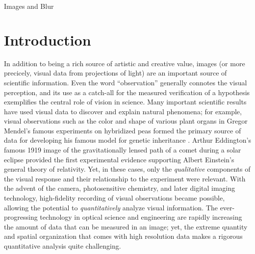 \setlength{\parindent}{2ex}
\begin{chapter}{Images and Blur}\label{chapter:introduction}
  \section{Introduction}
  In addition to being a rich source of artistic and creative value, images (or more precicely, visual data from projections of light) are an important source of scientific information.
  Even the word ``observation'' generally connotes the visual perception, and its use as a catch-all for the measured verification of a hypothesis exemplifies the central role of vision in science.
  Many important scientific results have used visual data to discover and explain natural phenomena; for example, visual observations such as the color and shape of various plant organs in Gregor Mendel's famous experiments on hybridized peas formed the primary source of data for developing his famous model for genetic inheritance \citep{magner2002}.
  Arthur Eddington's famous 1919 image of the gravitationally lensed path of a comet during a solar eclipse \citep{eddington1920} provided the first experimental evidence supporting Albert Einstein's general theory of relativity.
  Yet, in these cases, only the \emph{qualitative} components of the visual response and their relationship to the experiment were relevant.
  With the advent of the camera, photosensitive chemistry, and later digital imaging technology, high-fidelity recording of visual observations became possible, allowing the potential to \emph{quantitatively} analyze visual information.
  The ever-progressing technology in optical science and engineering are rapidly increasing the amount of data that can be measured in an image; yet, the extreme quantity and spatial organization that comes with high resolution data makes a rigorous quantitative analysis quite challenging.


\end{chapter}
